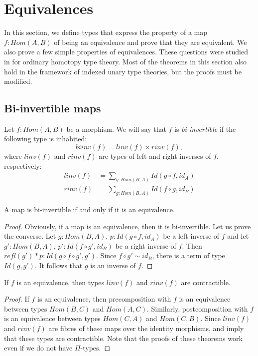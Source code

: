 \documentclass[reqno]{amsart}
\theoremstyle{definition}
\theoremstyle{remark}
\newcommand{\fs}[1]{\mathit{#1}}
\newcommand{\Hom}{\fs{Hom}}
\newcommand{\Id}{\fs{Id}}
\newcommand{\refl}{\fs{refl}}
\newcommand{\id}{\fs{id}}
\numberwithin{figure}{section}
\begin{document}
\section{Equivalences}

In this section, we define types that express the property of a map $f : \Hom(A,B)$ of being an equivalence and prove that they are equivalent.
We also prove a few simple properties of equivalences.
These questions were studied in \cite[Section~4]{hottbook} for ordinary homotopy type theory.
Most of the theorems in this section also hold in the framework of indexed unary type theories, but the proofs must be modified.

\subsection{Bi-invertible maps}

Let $f : \Hom(A,B)$ be a morphism.
We will say that $f$ is \emph{bi-invertible} if the following type is inhabited:
\[ \fs{biinv}(f) = \fs{linv}(f) \times \fs{rinv}(f), \]
where $\fs{linv}(f)$ and $\fs{rinv}(f)$ are types of left and right inverses of $f$, respectively:
\begin{align*}
\fs{linv}(f) & = \sum_{g : \Hom(B,A)} \Id(g \circ f, \id_A) \\
\fs{rinv}(f) & = \sum_{g : \Hom(B,A)} \Id(f \circ g, \id_B)
\end{align*}

\begin{prop}
A map is bi-invertible if and only if it is an equivalence.
\end{prop}
\begin{proof}
Obviously, if a map is an equivalence, then it is bi-invertible.
Let us prove the converse.
Let $g : \Hom(B,A)$, $p : \Id(g \circ f, \id_A)$ be a left inverse of $f$ and let $g' : \Hom(B,A)$, $p' : \Id(f \circ g', \id_B)$ be a right inverse of $f$.
Then $\refl(g') * p : \Id(g \circ f \circ g', g')$.
Since $f \circ g' \sim \id_B$, there is a term of type $\Id(g,g')$.
It follows that $g$ is an inverse of $f$.
\end{proof}

\begin{lem}
If $f$ is an equivalence, then types $\fs{linv}(f)$ and $\fs{rinv}(f)$ are contractible.
\end{lem}
\begin{proof}
If $f$ is an equivalence, then precomposition with $f$ is an equivalence between types $\Hom(B,C)$ and $\Hom(A,C)$.
Similarly, postcomposition with $f$ is an equivalence between types $\Hom(C,A)$ and $\Hom(C,B)$.
Since $\fs{linv}(f)$ and $\fs{rinv}(f)$ are fibres of these maps over the identity morphisms, \cite[Theorem~4.2.3]{hottbook} and \cite[Theorem~4.2.6]{hottbook} imply that these types are contractible.
Note that the proofs of these theorems work even if we do not have $\Pi$-types.
\end{proof}
\end{document}
